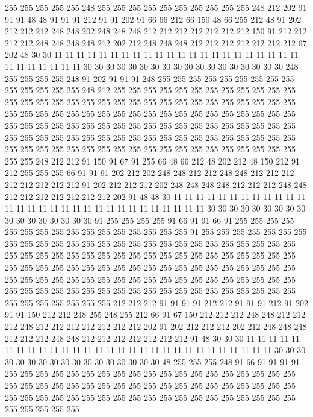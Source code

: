 255 255 255 255 255 248 255 255 255 255 255 255 255 255 255 255 248 212 202 91
91 91 48 48 91 91 91 212 91 91 202 91 66 66 212 66 150 48 66 255
212 48 91 202 212 212 212 248 248 202 248 248 248 212 212 212 212 212 212 212
150 91 212 212 212 212 248 248 248 248 212 202 212 248 248 248 212 212 212 212
212 212 212 67 202 48 30 30 11 11 11 11 11 11 11 11 11 11 11 11
11 11 11 11 11 11 11 11 11 11 11 11 11 11 11 11 11 30 30 30
30 30 30 30 30 30 30 30 30 30 30 30 30 30 30 248 255 255 255 255
248 91 202 91 91 91 248 255 255 255 255 255 255 255 255 255 255 255 255 255
255 248 212 255 255 255 255 255 255 255 255 255 255 255 255 255 255 255 255 255
255 255 255 255 255 255 255 255 255 255 255 255 255 255 255 255 255 255 255 255
255 255 255 255 255 255 255 255 255 255 255 255 255 255 255 255 255 255 255 255
255 255 255 255 255 255 255 255 255 255 255 255 255 255 255 255 255 255 255 255
255 255 255 255 255 255 255 255 255 255 255 255 255 255 255 255 255 255 255 255
255 255 255 255 255 255 255 255 255 255 255 255 248 212 212 91 150 91 67 91
255 66 48 66 212 48 202 212 48 150 212 91 212 255 255 255 66 91 91 91
202 212 202 248 248 212 212 248 248 212 212 212 212 212 212 212 212 91 202 212
212 212 202 248 248 248 248 212 212 212 248 248 212 212 212 212 212 212 212 202
91 48 48 30 11 11 11 11 11 11 11 11 11 11 11 11 11 11 11 11
11 11 11 11 11 11 11 11 11 11 11 11 11 11 30 30 30 30 30 30
30 30 30 30 30 30 30 30 30 30 30 91 255 255 255 255 91 66 91 91
66 91 255 255 255 255 255 255 255 255 255 255 255 255 255 255 255 255 91 255
255 255 255 255 255 255 255 255 255 255 255 255 255 255 255 255 255 255 255 255
255 255 255 255 255 255 255 255 255 255 255 255 255 255 255 255 255 255 255 255
255 255 255 255 255 255 255 255 255 255 255 255 255 255 255 255 255 255 255 255
255 255 255 255 255 255 255 255 255 255 255 255 255 255 255 255 255 255 255 255
255 255 255 255 255 255 255 255 255 255 255 255 255 255 255 255 255 255 255 255
255 255 255 255 255 255 255 255 212 212 212 91 91 91 91 212 212 91 91 91
212 91 202 91 91 150 212 212 248 255 248 255 212 66 91 67 150 212 212 212
248 248 212 212 212 248 212 212 212 212 212 212 212 202 91 202 212 212 212 202
212 248 248 248 212 212 212 248 248 212 212 212 212 212 212 212 91 48 30 30
30 11 11 11 11 11 11 11 11 11 11 11 11 11 11 11 11 11 11 11
11 11 11 11 11 11 11 11 11 11 30 30 30 30 30 30 30 30 30 30
30 30 30 30 30 30 30 48 255 255 255 248 91 66 91 91 91 91 255 255
255 255 255 255 255 255 255 255 255 255 255 255 255 255 255 255 255 255 255 255
255 255 255 255 255 255 255 255 255 255 255 255 255 255 255 255 255 255 255 255
255 255 255 255 255 255 255 255 255 255 255 255 255 255 255 255 255 255 255 255
